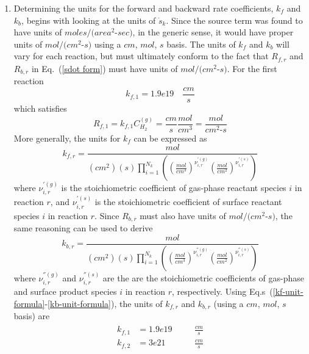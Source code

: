 \documentclass{report}
\newcommand{\eref}[1]{Eq.~(\ref{#1})}
\newcommand{\erefs}[2]{Eq.s~(\ref{#1}-\ref{#2})}
\newcommand{\sk}{\dot{s}_k}
\newcommand{\kf}[1]{k_{f,#1}}
\newcommand{\kb}[1]{k_{b,#1}}
\newcommand{\cg}[1]{{C_{#1}^{(g)}}}
\begin{document}
\begin{enumerate}[label=(\alph*)]
  \item Determining the units for the forward and backward rate coefficients,
  $k_f$ and $k_b$, begins with looking at the units of $\sk$.  Since the source
  term was found to have units of $moles/(area^2$-$sec)$, in the generic sense, it
  would have proper units of $mol/(cm^2$-$s)$ using a $cm$, $mol$, $s$ basis.
  The units of $k_f$ and $k_b$ will vary for each reaction, but must ultimately
  conform to the fact that $R_{f,r}$ and $R_{b,r}$ in \eref{sdot form} must have
  units of $mol/(cm^2$-$s)$.  For the first reaction
  \begin{equation}
    \kf{1} = 1.9e19 \quad \frac{cm}{s}
    \label{kf_units}
  \end{equation}
  which satisfies
  \begin{equation}
    R_{f,1} = k_{f,1}\cg{H_2} = \frac{cm}{s}\frac{mol}{cm^3} =
    \frac{mol}{cm^2\text{-}s}
    \label{R_units}
  \end{equation}
 More generally, the units for $k_f$ can be expressed as
  \begin{equation}
    \kf{r} = \frac{mol}{(cm^2)(s)\prod_{i=1}^{N_k}\left(
    \left( \frac{mol}{cm^3} \right)^{\nu_{i,r}^{'(g)}} \left( \frac{mol}{cm^2}
    \right)^{\nu_{i,r}^{'(s)}} \right)}
    \label{kf-unit-formula}
  \end{equation}
  where $\nu_{i,r}^{'(g)}$ is the stoichiometric coefficient of gas-phase
  reactant species $i$ in reaction $r$, and $\nu_{i,r}^{'(s)}$ is the
  stoichiometric coefficient of surface reactant species $i$ in reaction $r$.
  Since $R_{b,r}$ must also have units of $mol/(cm^2$-$s)$, the same reasoning can
  be used to derive
  \begin{equation}
    \kb{r} = \frac{mol}{(cm^2)(s)\prod_{i=1}^{N_k}\left(
    \left( \frac{mol}{cm^3} \right)^{\nu_{i,r}^{''(g)}} \left( \frac{mol}{cm^2}
    \right)^{\nu_{i,r}^{''(s)}} \right)}
    \label{kb-unit-formula}
  \end{equation}
  where $\nu_{i,r}^{''(g)}$ and $\nu_{i,r}^{''(s)}$ are the are the
  stoichiometric coefficients of gas-phase and surface product species $i$ in
  reaction $r$, respectively.  Using \erefs{kf-unit-formula}{kb-unit-formula},
  the units of $\kf{r}$ and $\kb{r}$ (using a $cm$, $mol$, $s$ basis) are
  \begin{align}
    \begin{alignedat}{2}
      \kf{1} &= 1.9e19 && \quad \frac{cm}{s} \\
      \kf{2} &= 3e21   && \quad \frac{cm}{s} \\

\end{alignedat}
\end{align}
\end{enumerate}
\end{document}
